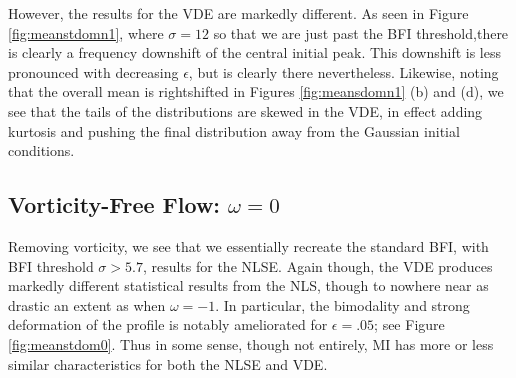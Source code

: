 \documentclass[a4paper,11pt]{article}
\begin{document}
However, the results for the VDE are markedly different.  As seen in Figure \ref{fig:meanstdomn1}, where $\sigma=12$ so that we are just past the BFI threshold,there is clearly a frequency downshift of the central initial peak.  This downshift is less pronounced with decreasing $\epsilon$, but is clearly there nevertheless.  Likewise, noting that the overall mean is rightshifted in Figures \ref{fig:meansdomn1} (b) and (d), we see that the tails of the distributions are skewed in the VDE, in effect adding kurtosis and pushing the final distribution away from the Gaussian initial conditions.  

\subsection*{Vorticity-Free Flow: $\omega = 0$}

Removing vorticity, we see that we essentially recreate the standard BFI, with BFI threshold $\sigma > 5.7$, results for the NLSE.  Again though, the VDE produces markedly different statistical results from the NLS, though to nowhere near as drastic an extent as when $\omega=-1$.  In particular, the bimodality and strong deformation of the profile is notably ameliorated for $\epsilon=.05$; see Figure \ref{fig:meanstdom0}.  Thus in some sense, though not entirely, MI has more or less similar characteristics for both the NLSE and VDE. 
\end{document}
